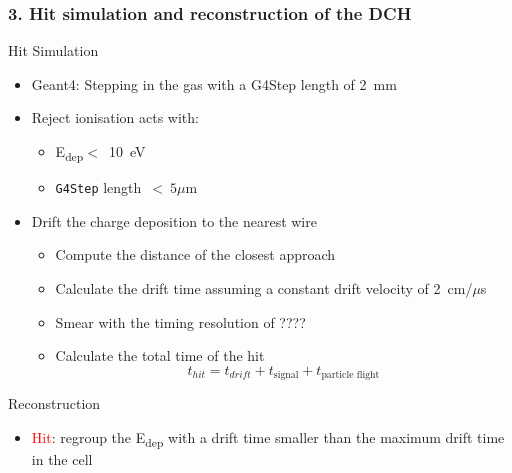 \documentclass[hyperref={colorlinks=true,pdfpagelabels=false,linkcolor=black}, xcolor=dvipsnames,10pt]{beamer}
\begin{document}
\begin{frame}
	\frametitle{3. Hit simulation and reconstruction of the DCH }
	
	\begin{block}{Hit Simulation}
	\begin{itemize}
	\item Geant4: Stepping in the gas with a G4Step length of 2~mm 
	\item Reject ionisation acts with:
		\begin{itemize}
		\item E\textsubscript{dep}$<$~10~eV
		\item \texttt{G4Step} length~$<~5\mu$m
		\end{itemize} 
	
	\item Drift the charge deposition to the nearest wire 
		\begin{itemize}
		\item Compute the distance of the closest approach
		\item Calculate the drift time assuming a constant drift velocity of 2~cm/$\mu$s
		\item Smear with the timing resolution of ????
		\item Calculate the total time of the hit \\
		\begin{equation}
	      t_{hit} = t_{drift}+t_{\text{signal}}+t_{\text{particle flight}}
    		\end{equation}
		\end{itemize} 
	\end{itemize}
	\end{block}
		
	\begin{block}{Reconstruction}
		\begin{itemize}
		\item \textcolor{Red}{Hit}: regroup the E\textsubscript{dep} with a drift time smaller than the maximum drift time in the cell
		\end{itemize}
	\end{block}

	
	
\end{frame}
\end{document}
